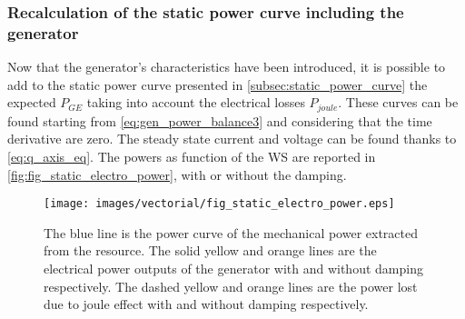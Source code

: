  \subsubsection[Power curve with generator]{Recalculation of the static power curve including the generator}\label{subsec:genertaor_power_curve}
 Now that the generator's characteristics have been introduced, it is possible to add to the static power curve presented in \autoref{subsec:static_power_curve} the expected $P_{GE}$ taking into account the electrical losses $P_{joule}$. These curves can be found starting from \autoref{eq:gen_power_balance3} and considering that the time derivative are zero. The steady state current and voltage can be found thanks to \autoref{eq:q_axis_eq}. The powers as function of the \acrshort{WS} are reported in \autoref{fig:fig_static_electro_power}, with or without the damping.
\begin{figure}[htb]
  \centering
  \texttt{[image: images/vectorial/fig\_static\_electro\_power.eps]}
\caption{The blue line is the power curve of the mechanical power extracted from the resource. The solid yellow and orange lines are the electrical power outputs of the generator with and without damping respectively. The dashed yellow and orange lines are the power lost due to joule effect with and without damping respectively. }
  \label{fig:fig_static_electro_power}
\end{figure}

 